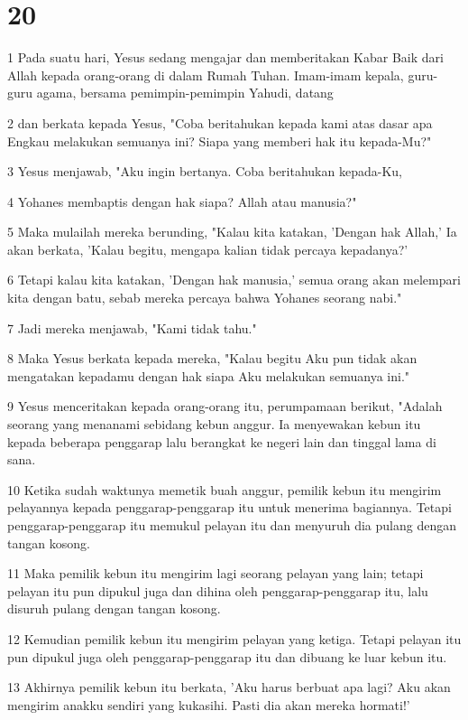\chapter{20}

\par 1 Pada suatu hari, Yesus sedang mengajar dan memberitakan Kabar Baik dari Allah kepada orang-orang di dalam Rumah Tuhan. Imam-imam kepala, guru-guru agama, bersama pemimpin-pemimpin Yahudi, datang
\par 2 dan berkata kepada Yesus, "Coba beritahukan kepada kami atas dasar apa Engkau melakukan semuanya ini? Siapa yang memberi hak itu kepada-Mu?"
\par 3 Yesus menjawab, "Aku ingin bertanya. Coba beritahukan kepada-Ku,
\par 4 Yohanes membaptis dengan hak siapa? Allah atau manusia?"
\par 5 Maka mulailah mereka berunding, "Kalau kita katakan, 'Dengan hak Allah,' Ia akan berkata, 'Kalau begitu, mengapa kalian tidak percaya kepadanya?'
\par 6 Tetapi kalau kita katakan, 'Dengan hak manusia,' semua orang akan melempari kita dengan batu, sebab mereka percaya bahwa Yohanes seorang nabi."
\par 7 Jadi mereka menjawab, "Kami tidak tahu."
\par 8 Maka Yesus berkata kepada mereka, "Kalau begitu Aku pun tidak akan mengatakan kepadamu dengan hak siapa Aku melakukan semuanya ini."
\par 9 Yesus menceritakan kepada orang-orang itu, perumpamaan berikut, "Adalah seorang yang menanami sebidang kebun anggur. Ia menyewakan kebun itu kepada beberapa penggarap lalu berangkat ke negeri lain dan tinggal lama di sana.
\par 10 Ketika sudah waktunya memetik buah anggur, pemilik kebun itu mengirim pelayannya kepada penggarap-penggarap itu untuk menerima bagiannya. Tetapi penggarap-penggarap itu memukul pelayan itu dan menyuruh dia pulang dengan tangan kosong.
\par 11 Maka pemilik kebun itu mengirim lagi seorang pelayan yang lain; tetapi pelayan itu pun dipukul juga dan dihina oleh penggarap-penggarap itu, lalu disuruh pulang dengan tangan kosong.
\par 12 Kemudian pemilik kebun itu mengirim pelayan yang ketiga. Tetapi pelayan itu pun dipukul juga oleh penggarap-penggarap itu dan dibuang ke luar kebun itu.
\par 13 Akhirnya pemilik kebun itu berkata, 'Aku harus berbuat apa lagi? Aku akan mengirim anakku sendiri yang kukasihi. Pasti dia akan mereka hormati!'
